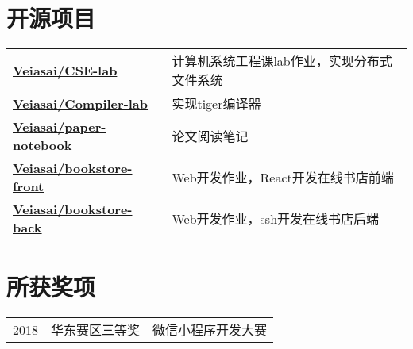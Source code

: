 \documentclass[]{deedy-resume-openfont}
\begin{document}
\begin{minipage}[t]{0.68\textwidth}

\section{开源项目}
\begin{tabular}{ll}
\href{https://github.com/veiasai/CSE-lab}{\bf Veiasai/CSE-lab} & 计算机系统工程课lab作业，实现分布式文件系统 \\
\href{https://github.com/Veiasai/Compiler-lab}{\bf Veiasai/Compiler-lab} & 实现tiger编译器 \\
\href{https://github.com/Veiasai/paper-notebook}{\bf Veiasai/paper-notebook} & 论文阅读笔记 \\
\href{https://github.com/Veiasai/bookstore_front}{\bf Veiasai/bookstore-front} & Web开发作业，React开发在线书店前端 \\
\href{https://github.com/Veiasai/bookstore_back}{\bf Veiasai/bookstore-back} & Web开发作业，ssh开发在线书店后端 \\
\end{tabular}
\sectionsep


\section{所获奖项} 
\begin{tabular}{rll}
2018         & 华东赛区三等奖  & 微信小程序开发大赛 \\
\end{tabular}
\sectionsep


% 
% 

\end{minipage} 
\end{document}
